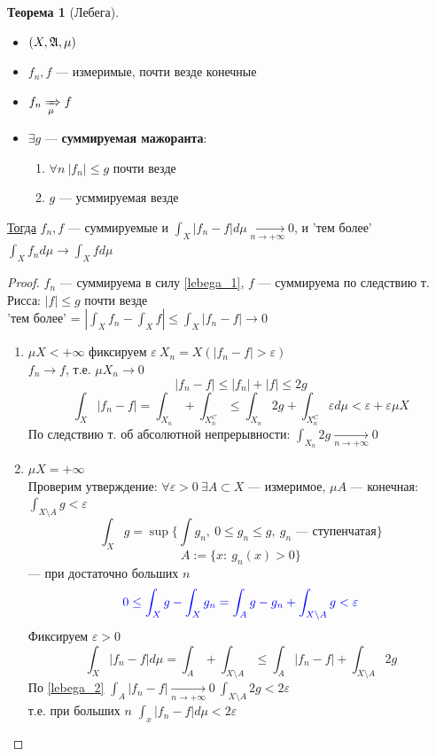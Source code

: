 \documentclass[russ,oneside]{book}
\theoremstyle{plain}
\theoremstyle{remark}
\theoremstyle{definition}
\newtheorem{theorem}{Теорема}[section]
\begin{document}
\begin{theorem}[Лебега]
\-
\begin{itemize}
\item \((X, \mathfrak{A}, \mu)\)
\item \(f_n, f\) --- измеримые, почти везде конечные
\item \(f_n \xRightarrow[\mu]{} f\)
\item \(\exists g\) --- \textbf{суммируемая мажоранта}:
\begin{enumerate}
\item \label{lebega_1} \(\forall n\ |f_n| \le g\) почти везде
\item \(g\) --- усммируемая везде
\end{enumerate}
\end{itemize}
\uline{Тогда} \(f_n, f\) --- суммируемые и \(\int_X |f_n - f|d\mu\xrightarrow[n \to + \infty]{}0\), и 'тем более' \(\int_X f_n d\mu \to \int_X f d\mu\)
\end{theorem}
\begin{proof}
\(f_n\) --- суммируема в силу \ref{lebega_1}, \(f\) --- суммируема по следствию т. Рисса: \(|f| \le g\) почти везде \\
'тем более' = \(\left|\int_X f_n - \int_X f \right| \le \int_X |f_n - f| \to 0\)
\begin{enumerate}
\item \label{lebega_2} \(\mu X < + \infty\) фиксируем \(\varepsilon\ X_n = X(|f_n - f| > \varepsilon)\) \\
\(f_n \to f\), т.е. \(\mu X_n \to 0\)
\[ |f_n - f| \le |f_n| + |f| \le 2g \]
\[ \int_X|f_n - f| = \int_{X_n}+\int_{X_n^C} \le \int_{X_n} 2g + \int_{X_n^C} \varepsilon d\mu < \varepsilon + \varepsilon \mu X\]
По следствию т. об абсолютной непрерывности: \(\int_{X_n} 2g \xrightarrow[n \to + \infty]{} 0\)
\item \(\mu X = + \infty\) \\
Проверим утверждение: \(\forall \varepsilon > 0\ \exists A \subset X\) --- измеримое, \(\mu A\) --- конечная: \(\int_{X\setminus A} g < \varepsilon\)
\[ \int_X g = \sup \{\int g_n,\ 0\le g_n\le g,\ g_n\text{ --- ступенчатая}\} \]
\[ A := \{x:\ g_n(x) > 0\} \]
--- при достаточно больших \(n\)
\[\color{blue} 0 \le \int_X g - \int_X g_n = \int_A g- g_n + \int_{X\setminus A}g < \varepsilon \]
Фиксируем \(\varepsilon > 0\)
\[ \int_X |f_n - f| d\mu = \int_A + \int_{X\setminus A} \le \int_A |f_n -f| + \int_{X\setminus A}2g \]
По \ref{lebega_2} \(\int_A|f_n - f| \xrightarrow[n \to + \infty]{} 0\ \int_{X\setminus A}2g < 2\varepsilon\) \\
т.е. при больших \(n\) \(\int_x |f_n -f|d\mu < 2\varepsilon\)
\end{enumerate}
\end{proof}
\end{document}

